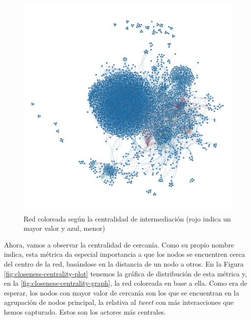 \begin{figure}
    \centering
    \includegraphics[width=\textwidth]{images/graph/betweenness-centrality.png}
    \caption{Red coloreada según la centralidad de intermediación (rojo indica un mayor valor y azul, menor)}
    \label{fig:betweenness-centrality-graph}
\end{figure}

Ahora, vamos a observar la centralidad de cercanía. Como su propio nombre
indica, esta métrica da especial importancia a que los nodos se encuentren cerca
del centro de la red, basándose en la distancia de un nodo a otros. En la Figura
\ref{fig:closeness-centrality-plot} tenemos la gráfica de distribución de esta
métrica y, en la \ref{fig:closeness-centrality-graph}, la red coloreada en base
a ella. Como era de esperar, los nodos con mayor valor de cercanía son los que
se encuentran en la agrupación de nodos principal, la relativa al \textit{tweet}
con más interacciones que hemos capturado. Estos son los actores más centrales.

